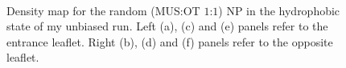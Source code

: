 \begin{figure}[p]
{		}\\%
	\caption{Density map for the random (\acs{MUS}:\acs{OT} $1$:$1$) \acs{NP} in the hydrophobic state of my unbiased run. Left (a), (c) and (e) panels refer to the entrance leaflet. Right (b), (d) and (f) panels refer to the opposite leaflet.}%
	\label{fig:randomDensity}
\end{figure}
%
